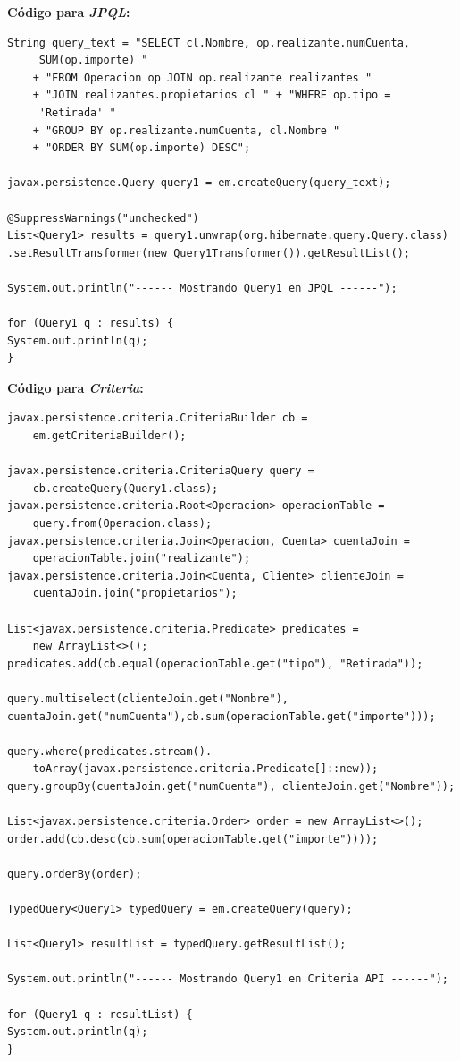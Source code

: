 \documentclass[11pt,a4paper]{article}
\begin{document}
\textbf{Código para \textit{JPQL}:}
\begin{lstlisting}
String query_text = "SELECT cl.Nombre, op.realizante.numCuenta,
	 SUM(op.importe) "
	+ "FROM Operacion op JOIN op.realizante realizantes "
	+ "JOIN realizantes.propietarios cl " + "WHERE op.tipo =
	 'Retirada' "
	+ "GROUP BY op.realizante.numCuenta, cl.Nombre " 
	+ "ORDER BY SUM(op.importe) DESC";

javax.persistence.Query query1 = em.createQuery(query_text);

@SuppressWarnings("unchecked")
List<Query1> results = query1.unwrap(org.hibernate.query.Query.class)
.setResultTransformer(new Query1Transformer()).getResultList();

System.out.println("------ Mostrando Query1 en JPQL ------");

for (Query1 q : results) {
System.out.println(q);
}
\end{lstlisting}
\textbf{Código para \textit{Criteria}:}
\begin{lstlisting}
javax.persistence.criteria.CriteriaBuilder cb = 
	em.getCriteriaBuilder();

javax.persistence.criteria.CriteriaQuery query = 
	cb.createQuery(Query1.class);
javax.persistence.criteria.Root<Operacion> operacionTable = 
	query.from(Operacion.class);
javax.persistence.criteria.Join<Operacion, Cuenta> cuentaJoin = 
	operacionTable.join("realizante");
javax.persistence.criteria.Join<Cuenta, Cliente> clienteJoin = 
	cuentaJoin.join("propietarios");

List<javax.persistence.criteria.Predicate> predicates = 
	new ArrayList<>();
predicates.add(cb.equal(operacionTable.get("tipo"), "Retirada"));

query.multiselect(clienteJoin.get("Nombre"), 
cuentaJoin.get("numCuenta"),cb.sum(operacionTable.get("importe")));

query.where(predicates.stream().
	toArray(javax.persistence.criteria.Predicate[]::new));
query.groupBy(cuentaJoin.get("numCuenta"), clienteJoin.get("Nombre"));

List<javax.persistence.criteria.Order> order = new ArrayList<>();
order.add(cb.desc(cb.sum(operacionTable.get("importe"))));

query.orderBy(order);

TypedQuery<Query1> typedQuery = em.createQuery(query);

List<Query1> resultList = typedQuery.getResultList();

System.out.println("------ Mostrando Query1 en Criteria API ------");

for (Query1 q : resultList) {
System.out.println(q);
}

\end{lstlisting}
\end{document}
